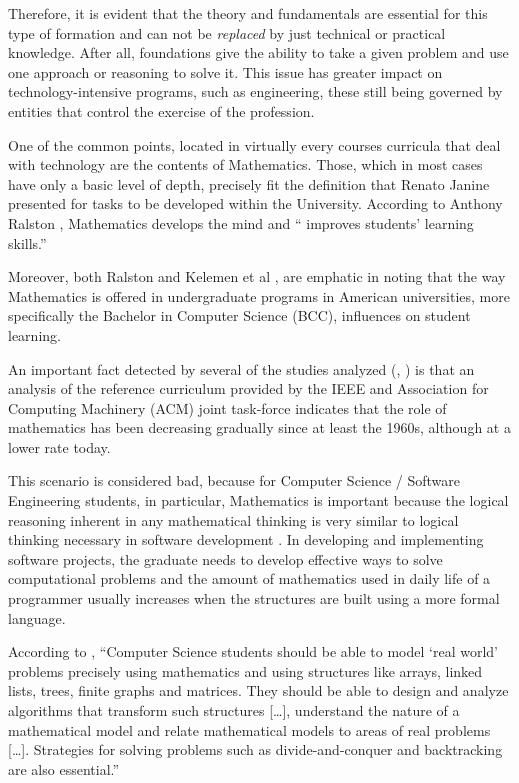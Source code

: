 \documentclass[conference]{IEEEtran}
\begin{document}
	Therefore, it is evident that the theory and fundamentals are essential for this type of formation and can not be \emph{replaced} by just technical or practical knowledge. After all, foundations give the ability to take a given problem and use one approach or reasoning to solve it. This issue has greater impact on technology-intensive programs, such as engineering, these still being governed by entities that control the exercise of the profession.

	One of the common points, located in virtually every courses curricula that deal with technology are the contents of Mathematics. Those, which in most cases have only a basic level of depth, precisely fit the definition that Renato Janine presented for tasks to be developed within the University. According to Anthony Ralston \cite{ralston:do_need_mathematics}, Mathematics develops the mind and `` improves students' learning skills.''

	Moreover, both Ralston and Kelemen et al \cite{kelemen:has_become_math_phobic}, are emphatic in noting that the way Mathematics is offered in undergraduate programs in American universities, more specifically the Bachelor in Computer Science (BCC), influences on student learning.

	An important fact detected by several of the studies analyzed (\cite{ralston:do_need_mathematics}, \cite{tucker:our_curriculum_math_phobic}) is that an analysis of the reference curriculum provided by the IEEE and Association for Computing Machinery (ACM) joint task-force \cite{cs2001} \cite{cs2008} indicates that the role of mathematics has been decreasing gradually since at least the 1960s, although at a lower rate today.

	This scenario is considered bad, because for Computer Science / Software Engineering students, in particular, Mathematics is important because the logical reasoning inherent in any mathematical thinking is very similar to logical thinking necessary in software development \cite{ralston:do_need_mathematics}. In developing and implementing software projects, the graduate needs to develop effective ways to solve computational problems and the amount of mathematics used in daily life of a programmer usually increases when the structures are built using a more formal language. \cite{ralston:do_need_mathematics}

	According to \cite{kelemen:has_become_math_phobic}, ``Computer Science students should be able to model `real world' problems precisely using mathematics and using structures like arrays, linked lists, trees, finite graphs and matrices. They should be able to design and analyze algorithms that transform such structures [\ldots], understand the nature of a mathematical model and relate mathematical models to areas of real problems [\ldots]. Strategies for solving problems such as divide-and-conquer and backtracking are also essential.''
\end{document}
